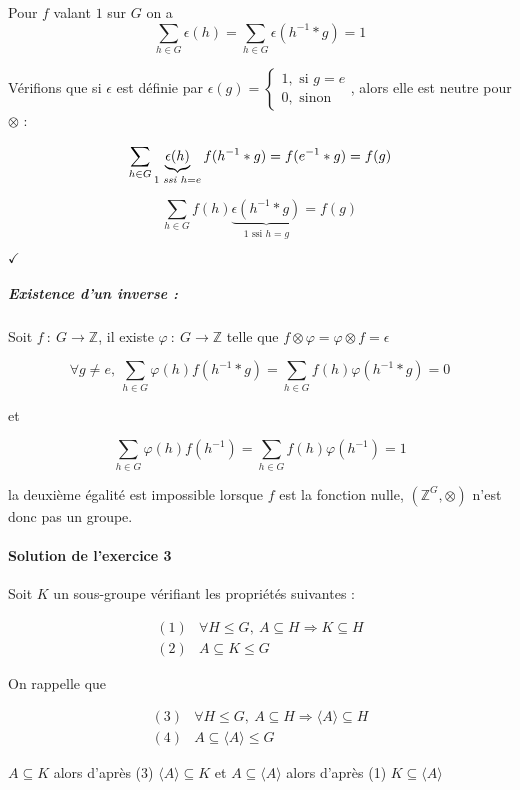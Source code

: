 \documentclass[]{article}
\theoremstyle{remark}
\theoremstyle{definition}
\newcommand{\checked}{
	\hfill$\checkmark$
}
\newcommand{\funcshort}[3]{
#1 ~ : ~ #2 \longrightarrow #3
}
\begin{document}
Pour $f$ valant $1$ sur $G$ on a
$$\sum_{h \in G}\epsilon(h)=\sum_{h \in G}\epsilon(h^{-1}*g)=1$$

Vérifions que si $\epsilon$ est définie par $\epsilon(g) = \left\{
\begin{array}{l}
	1, \text{ si } g = e \\
	0, \text{ sinon}
\end{array}
\right.$, alors elle est neutre pour $\otimes$ :

$$\sum_{h \in G}\underbrace{\epsilon(h)}_{1 \text{ \textit{ssi} } h = e}f(h^{-1}*g) = f(e^{-1}*g) = f(g)$$

$$\sum_{h \in G}f(h)\underbrace{\epsilon(h^{-1}*g)}_{1 \text{ ssi } h = g}=f(g)$$

\checked

\subparagraph{Existence d'un inverse :}
Soit $\funcshort{f}{G}{\mathbb{Z}}$, il existe $\funcshort{\varphi}{G}{\mathbb{Z}}$ telle que $f \otimes \varphi = \varphi \otimes f = \epsilon$

$$\forall g \neq e, ~ \sum_{h \in G}\varphi(h)f(h^{-1}*g)=\sum_{h \in G}f(h)\varphi(h^{-1}*g)=0$$

et

$$\sum_{h \in G}\varphi(h)f(h^{-1})=\sum_{h \in G}f(h)\varphi(h^{-1})=1$$

la deuxième égalité est impossible lorsque $f$ est la fonction nulle, $\left(\mathbb{Z}^G, \otimes\right)$ n'est donc pas un groupe.

\paragraph{Solution de l'exercice 3}
Soit $K$ un sous-groupe vérifiant les propriétés suivantes :

$$
	\begin{array}{lc}
		(1) & \forall H \leqslant G, ~ A \subseteq H \Longrightarrow K \subseteq H \\
		(2) & A \subseteq K \leqslant G
	\end{array}
$$

On rappelle que 

$$
	\begin{array}{lc}
		(3) & \forall H \leqslant G, ~ A \subseteq H \Longrightarrow \langle A \rangle \subseteq H \\
		(4) & A \subseteq \langle A \rangle \leqslant G
	\end{array}
$$

$A \subseteq K$ alors d'après (3) $\langle A \rangle \subseteq K$ et $A \subseteq \langle A \rangle$ alors d'après (1) $K \subseteq \langle A \rangle$
\end{document}
